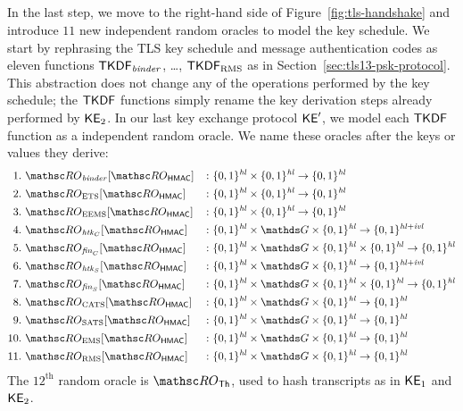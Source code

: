 	 \subsection{\StepThreeTitle}
\fi

\label{sec:many-ros}
In the last step, we move to the right-hand side of Figure~\ref{fig:tls-handshake} and introduce $11$ new independent random oracles to model the key schedule.
We start by rephrasing the TLS key schedule and message authentication codes as eleven functions $\mathsf{TKDF}_{\mathit{binder}}$, \dots, $\mathsf{TKDF}_{\mathrm{RMS}}$ as in Section~\ref{sec:tls13-psk-protocol}.
This abstraction does not change any of the operations performed by the key schedule; the $\mathsf{TKDF}$ functions simply rename the key derivation steps already performed by $\mathsf{KE}_2$. 
In our last key exchange protocol $\mathsf{KE}'$, we model each $\mathsf{TKDF}$ function as a independent random oracle. 
We name these oracles after the keys or values they derive:
{\allowdisplaybreaks
\begin{align*}
1.~ &\RO_{\binder}[\ROhmac]	&&\colon \bits^{\hashlen}  \times \bits^{\hashlen}\to \bits^{\hashlen} \\
2.~ &\RO_{\ets}[\ROhmac]	&&\colon \bits^{\hashlen} \times \bits^{\hashlen} \to \bits^{\hashlen} \\
3.~ &\RO_{\eems}[\ROhmac]	&&\colon \bits^{\hashlen} \times \bits^{\hashlen}  \to \bits^{\hashlen}\\
4.~ &\RO_{\chtk}[\ROhmac]	&&\colon \bits^{\hashlen}\times \G \times \bits^{\hashlen} \to \bits^{\hashlen + \ivlen} \\
5.~ &\RO_{\cfin}[\ROhmac]		&&\colon \bits^{\hashlen} \times \G \times \bits^{\hashlen} \times \bits^{\hashlen} \to \bits^{\hashlen} \\
6.~ &\RO_{\shtk}[\ROhmac]	&&\colon \bits^{\hashlen} \times \G \times \bits^{\hashlen} \to \bits^{\hashlen + \ivlen} \\
7.~ &\RO_{\sfin}[\ROhmac]		&&\colon \bits^{\hashlen} \times \G \times \bits^{\hashlen} \times \bits^{\hashlen} \to \bits^{\hashlen} \\
8.~ &\RO_{\cats}[\ROhmac]	&&\colon \bits^{\hashlen}\times \G \times \bits^{\hashlen} \to \bits^{\hashlen} \\
9.~ &\RO_{\sats}[\ROhmac] &&\colon \bits^{\hashlen} \times \G \times \bits^{\hashlen} \to \bits^{\hashlen} \\
10.~ &\RO_{\ems}[\ROhmac]	&&\colon \bits^{\hashlen} \times \G \times \bits^{\hashlen} \to \bits^{\hashlen} \\
11.~ &\RO_{\rms}[\ROhmac]	&&\colon \bits^{\hashlen} \times \G \times \bits^{\hashlen} \to \bits^{\hashlen}
\end{align*}
}
The $12^\text{th}$ random oracle is $\ROthash$, used to hash transcripts as in $\mathsf{KE}_1$ and $\mathsf{KE}_2$.


